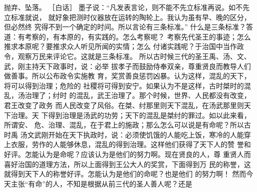 \documentclass[12pt,UTF8]{ctexbook}
\begin{document}
抛弃、坠落。 
［白话］ 
墨子说：“凡发表言论，则不能不先立标准再说。如不先立标准就说， 
就好象把测时仪器放在运转的陶轮上。我认为虽有早、晚的区分，但必然终 
究得不到一个确定的时间。所以言论有三条标准。” 
什么是三条标准？答道：有考察的，有本原的，有实践的。怎么考察呢？ 
考察先代圣王的事迹；怎么推求本原呢？要推求众人听见所闻的实情；怎么 
付诸实践呢？于治国中当作政令，观察万民来评论它。这就是三条标准。 
所以古时候三代的圣王禹、汤、文、武，刚主持天下政事时，说：必举 
拔孝子而鼓励侍奉双亲，尊重贤良而教导人们做善事。所以公布政令实施教 
育，奖赏善良惩罚凶暴。认为这样，混乱的天下，将可以得到治理；危险的 
社稷将可得到安宁。如果认为不是这样，古时桀时的混乱，汤治理了；纣时 
的混乱，武王治理了。那个时候，世界、人民都没有改变，君王改变了政务 
而人民改变了风俗。在桀、纣那里则天下混乱，在汤武那里则天下治理。天 
下得到治理是汤武的功劳；天下的混乱是桀纣的罪过。如以此来看，所谓安、 
危、治理、混乱，在于君上的施政；那么怎么可以说是有命呢？所以古时禹 
汤文武刚开始在天下执政时，说：必须使饥饿的人能吃上饭，寒冷的人能穿 
上衣服，劳作的人能够休息，混乱的得到治理。这样他们获得了天下人的赞 
誉和好评。怎能认为是命呢？应该认为是他们的努力啊。现在贤良的人，尊 
重贤人而喜好治国的道理方法，所以上面得到王公大人的奖赏，下面得到万 
民的称誉，这就得到天下人的称誉好评。怎能认为是他们的命呢？也是他们 
的努力啊！ 
然而今天主张“有命”的人，不知是根据从前三代的圣人善人呢？还是 
\end{document}
